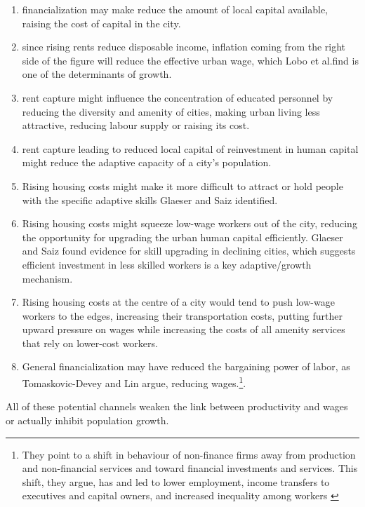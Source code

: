  
\begin{enumerate}
\item financialization may make reduce the amount of local capital available, raising the cost of capital in the city. 
    
\item since rising rents reduce disposable income, inflation coming from the right  side of the figure will reduce  the effective urban wage, which Lobo et al.find is one of the determinants of growth.

\item rent capture might influence the concentration of educated personnel by reducing the diversity and amenity of cities, making urban living less attractive, reducing labour supply or raising its cost.

\item rent capture leading to reduced local capital of reinvestment in human capital  might reduce the adaptive capacity of a city's population.

\item Rising housing costs might make it more difficult to attract or hold people with the specific adaptive skills Glaeser and Saiz identified.

\item  Rising housing costs might squeeze low-wage workers out of the city, reducing the opportunity for upgrading the urban human capital efficiently. Glaeser and Saiz found   evidence for skill upgrading  in declining cities, which suggests efficient investment in less skilled workers is a key adaptive/growth mechanism. 

\item Rising housing costs at the centre of a city would tend to push low-wage workers to the edges, increasing their transportation costs, putting further upward pressure on wages while increasing the costs of all amenity services that rely on lower-cost workers.

\item General financialization may have reduced the bargaining power of labor, as Tomaskovic-Devey and Lin  argue\cite{tomaskovic-deveyFinancializationCausesInequality2013}, reducing wages.\footnote{They point to a shift in behaviour of non-finance firms away from production and non-financial services and toward financial investments and services. This shift, they  argue,  has and led to lower employment, income transfers to executives and capital owners, and increased inequality among workers \cite{tomaskovic-deveyFinancializationCausesInequality2013}}.
\end{enumerate}
All of these potential channels weaken the link between productivity and wages or actually inhibit population growth.


